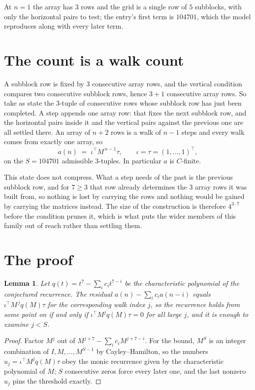 \documentclass[11pt,a4paper]{article}
\theoremstyle{plain}
\newtheorem{lemma}[theorem]{Lemma}
\theoremstyle{definition}
\begin{document}
At $n=1$ the array has $3$ rows and the grid is a single row of $5$
subblocks, with only the horizontal pairs to test; the entry's first term is
$104701$, which the model reproduces along with every later term.

\section{The count is a walk count}

A subblock row is fixed by $3$ consecutive array rows, and the vertical condition compares
two consecutive subblock rows, hence $3+1$ consecutive array rows. So take as state the
$3$-tuple of consecutive rows whose subblock row has just been completed. A step appends one
array row: that fixes the next subblock row, and the horizontal pairs inside it and the
vertical pairs against the previous one are all settled there. An array of $n+2$ rows is
a walk of $n-1$ steps and every walk comes from exactly one array, so
\[
a(n)\;=\;\iota^{\!\top}M^{\,n-1}\tau,\qquad\iota=\tau=(1,\dots,1)^{\!\top},
\]
on the $S=104701$ admissible $3$-tuples. In particular $a$ is $C$-finite.

This state does not compress. What a step needs of the past is the previous subblock row, and
for $7\ge3$ that row already determines the $3$ array rows it was built from, so nothing
is lost by carrying the rows and nothing would be gained by carrying the matrices instead. The
size of the construction is therefore $4^{3\cdot7}$ before the condition prunes
it, which is what puts the wider members of this family out of reach rather than settling them.

\section{The proof}

\begin{lemma}\label{lem:crit}
Let $q(t)=t^{7}-\sum_i c_it^{7-i}$ be the characteristic polynomial of the
conjectured recurrence. The residual $a(n)-\sum_ic_ia(n-i)$ equals
$\iota^{\!\top}M^{\,j}q(M)\tau$ for the corresponding walk index $j$, so the recurrence
holds from some point on if and only if $\iota^{\!\top}M^{j}q(M)\tau=0$ for all large $j$,
and it is enough to examine $j<S$.
\end{lemma}

\begin{proof}
Factor $M^{j}$ out of $M^{j+7}-\sum_ic_iM^{j+7-i}$. For the bound, $M^{S}$
is an integer combination of $I,M,\dots,M^{S-1}$ by Cayley--Hamilton, so the numbers
$u_j=\iota^{\!\top}M^{j}q(M)\tau$ obey the monic recurrence given by the characteristic
polynomial of $M$; $S$ consecutive zeros force every later one, and the last nonzero $u_j$
pins the threshold exactly.
\end{proof}
\end{document}
